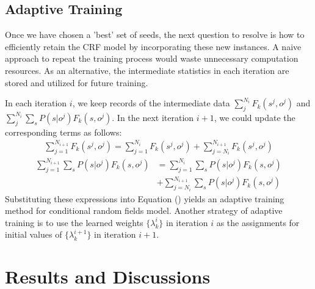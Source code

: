 \documentclass[10pt]{article}
\begin{document}
\subsection{Adaptive Training}
Once we have chosen a 'best' set of seeds, the next question to resolve is how to efficiently retain the CRF model by incorporating these new instances. A naive approach to repeat the training process would waste unnecessary computation resources. As an alternative, the intermediate statistics in each iteration are stored and utilized for future training. 

In each iteration $i$, we keep records of the intermediate data $\sum_j^{N_i} F_k(s^j, o^j)$ and $\sum_j^{N_i} \sum_s P(s|o^j) F_k(s, o^j)$. In the next iteration $i+1$, we could update the corresponding terms as follows:
\begin{align*} 
	\sum_{j=1}^{N_{i+1}} F_k(s^j, o^j)  = \sum_{j=1}^{N_i} F_k(s^j, o^j) + \sum_{j=N_i}^{N_{i+1}} F_k(s^j, o^j) 
\end{align*}
\begin{align*}
\sum_{j=1}^{N_{i+1}}  \sum_s P(s|o^j) F_k(s, o^j) & = \sum_{j=1}^{N_i} \sum_s P(s|o^j) F_k(s, o^j)\\
		&+ \sum_{j = N_i}^{N_{i+1}} \sum_s P(s|o^j) F_k(s, o^j)
\end{align*}
Substituting these expressions into Equation () yields an adaptive training method for conditional random fields model. Another strategy of adaptive training is to use the learned weights $\{ \lambda_k^i \}$ in iteration $i$ as the assignments for initial values of $\{ \lambda_k^{i+1}\}$ in iteration $i+1$.

\section{Results and Discussions}
\end{document}
